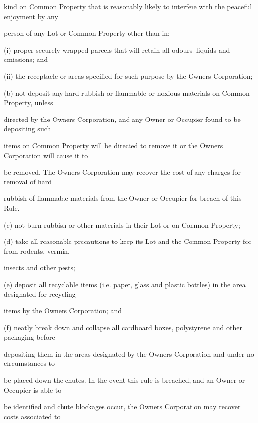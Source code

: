 \documentclass{article}
\begin{document}
{\fontsize{10.02}{1}kind on Common Property that is reasonably likely to interfere with the peaceful enjoyment by any }

{\fontsize{10.02}{1}person of any Lot or Common Property other than in: }

{\fontsize{9.962}{1}(i) proper securely wrapped parcels that will retain all odours, liquids and emissions; and }

{\fontsize{9.962}{1}(ii) the receptacle or areas specified for such purpose by the Owners Corporation; }

{\fontsize{9.962}{1}(b) not deposit any hard rubbish or flammable or noxious materials on Common Property, unless }

{\fontsize{10.02}{1}directed by the Owners Corporation, and any Owner or Occupier found to be depositing such }

{\fontsize{10.02}{1}items on Common Property will be directed to remove it or the Owners Corporation will cause it to }

{\fontsize{10.02}{1}be removed. The Owners Corporation may recover the cost of any charges for removal of hard }

{\fontsize{10.02}{1}rubbish of flammable materials from the Owner or Occupier for breach of this Rule. }

{\fontsize{9.962}{1}(c) not burn rubbish or other materials in their Lot or on Common Property; }

{\fontsize{9.962}{1}(d) take all reasonable precautions to keep its Lot and the Common Property fee from rodents, vermin, }

{\fontsize{10.02}{1}insects and other pests; }

{\fontsize{9.962}{1}(e) deposit all recyclable items (i.e. paper, glass and plastic bottles) in the area designated for recycling }

{\fontsize{10.02}{1}items by the Owners Corporation; and }

{\fontsize{9.962}{1}(f) neatly break down and collapse all cardboard boxes, polystyrene and other packaging before }

{\fontsize{10.02}{1}depositing them in the areas designated by the Owners Corporation and under no circumstances to }

{\fontsize{10.02}{1}be placed down the chutes. In the event this rule is breached, and an Owner or Occupier is able to }

{\fontsize{10.02}{1}be identified and chute blockages occur, the Owners Corporation may recover costs associated to }
\end{document}
